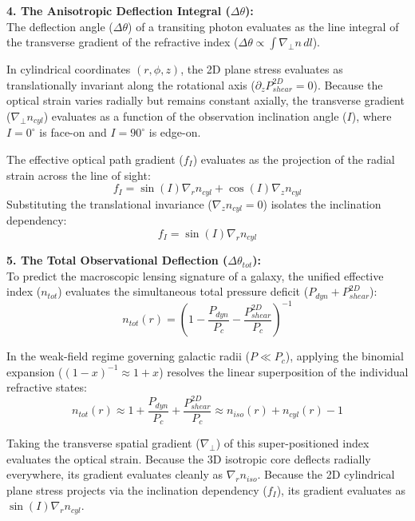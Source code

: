 \textbf{4. The Anisotropic Deflection Integral ($\Delta \theta$):} \\
The deflection angle ($\Delta \theta$) of a transiting photon evaluates as the line integral of the transverse gradient of the refractive index ($\Delta \theta \propto \int \nabla_{\perp} n \, dl$).

In cylindrical coordinates $(r, \phi, z)$, the 2D plane stress evaluates as translationally invariant along the rotational axis ($\partial_z P_{shear}^{2D} = 0$). 
Because the optical strain varies radially but remains constant axially, the transverse gradient ($\nabla_{\perp} n_{cyl}$) evaluates as a function of the observation inclination angle ($I$), where $I=0^\circ$ is face-on and $I=90^\circ$ is edge-on. 

The effective optical path gradient ($f_I$) evaluates as the projection of the radial strain across the line of sight: 
\begin{equation}
    f_I = \sin(I) \nabla_r n_{cyl} + \cos(I) \nabla_z n_{cyl}
\end{equation}
Substituting the translational invariance ($\nabla_z n_{cyl} = 0$) isolates the inclination dependency:
\begin{equation}
    f_I = \sin(I) \nabla_r n_{cyl} \label{eq:inclination_bias}
\end{equation}

\textbf{5. The Total Observational Deflection ($\Delta \theta_{tot}$):} \\
To predict the macroscopic lensing signature of a galaxy, the unified effective index ($n_{tot}$) evaluates the simultaneous total pressure deficit ($P_{dyn} + P_{shear}^{2D}$): %
\begin{equation}
    n_{tot}(r) = \left( 1 - \frac{P_{dyn}}{P_c} - \frac{P_{shear}^{2D}}{P_c} \right)^{-1}
\end{equation}

In the weak-field regime governing galactic radii ($P \ll P_c$), applying the binomial expansion ($(1-x)^{-1} \approx 1+x$) resolves the linear superposition of the individual refractive states:
\begin{equation}
    n_{tot}(r) \approx 1 + \frac{P_{dyn}}{P_c} + \frac{P_{shear}^{2D}}{P_c} \approx n_{iso}(r) + n_{cyl}(r) - 1
\end{equation}

Taking the transverse spatial gradient ($\nabla_\perp$) of this super-positioned index evaluates the optical strain. Because the 3D isotropic core deflects radially everywhere, its gradient evaluates cleanly as $\nabla_r n_{iso}$. Because the 2D cylindrical plane stress projects via the inclination dependency ($f_I$), its gradient evaluates as $\sin(I) \nabla_r n_{cyl}$.

